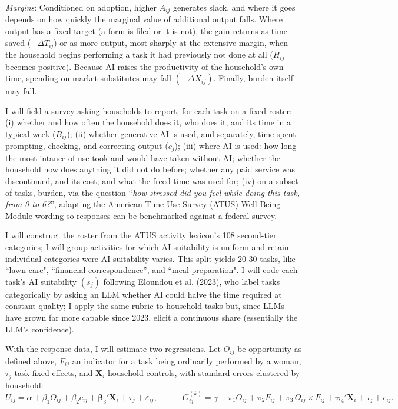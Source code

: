 \documentclass[11pt]{article}
\begin{document}
\textit{Margins}: Conditioned on adoption, higher $A_{ij}$ generates slack, and where it goes depends on how quickly the marginal value of additional output falls. Where output has a fixed target (a form is filed or it is not), the gain returns as time saved ($-\Delta T_{ij}$) or as more output, most sharply at the extensive margin, when the household begins performing a task it had previously not done at all ($H_{ij}$ becomes positive). Because AI raises the productivity of the household's own time, spending on market substitutes may fall $(-\Delta X_{ij})$. Finally, burden itself may fall. 

I will field a survey asking households to report, for each task on a fixed roster: (i) whether and how often the household does it, who does it, and its time in a typical week ($B_{ij}$); (ii) whether generative AI is used, and separately, time spent prompting, checking, and correcting output ($c_j$); (iii) where AI is used: how long the most intance of use took and would have taken without AI; whether the household now does anything it did not do before; whether any paid service was discontinued, and its cost; and what the freed time was used for; (iv) on a subset of tasks, burden, via the question ``\textit{how stressed did you feel while doing this task, from 0 to 6?}'', adapting the American Time Use Survey (ATUS) Well-Being Module wording so responses can be benchmarked against a federal survey.

I will construct the roster from the ATUS activity lexicon's 108 second-tier categories; I will group activities for which AI suitability is uniform and retain individual categories were AI suitability varies. This split yields 20-30 tasks, like ``lawn care", ``financial correspondence'', and ``meal preparation". I will code each task's AI suitability $(s_j)$ following Eloundou et al. (2023), who label tasks categorically by asking an LLM whether AI could halve the time required at constant quality; I apply the same rubric to household tasks but, since LLMs have grown far more capable since 2023, elicit a continuous share (essentially the LLM's confidence). 

With the response data, I will estimate two regressions. Let $O_{ij}$ be opportunity as defined above, $F_{ij}$ an indicator for a task being ordinarily performed by a woman, $\tau_j$ task fixed effects, and $\mathbf{X}_i$ household controls, with standard errors clustered by household:
\begin{equation}
U_{ij} = \alpha + \beta_1 O_{ij} + \beta_2 c_{ij} + \boldsymbol{\beta}_3'\mathbf{X}_i + \tau_j + \varepsilon_{ij}, \qquad\quad
G^{(k)}_{ij} = \gamma + \pi_1 O_{ij} + \pi_2 F_{ij} + \pi_3\, O_{ij}\!\times\! F_{ij} + \boldsymbol{\pi}_4'\mathbf{X}_i + \tau_j + \epsilon_{ij}.
\end{equation}
\end{document}
